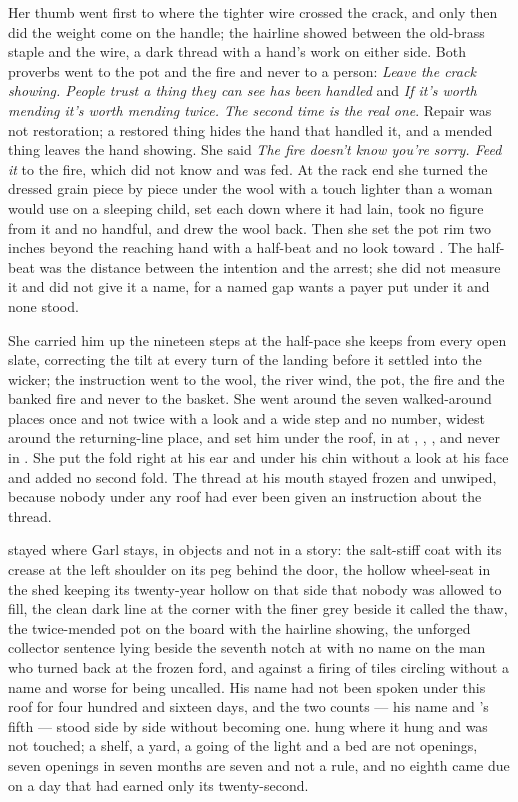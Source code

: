 Her thumb went first to where the tighter wire crossed the crack, and only then did the weight come on the handle; the hairline showed between the old-brass staple and the wire, a dark thread with a hand's work on either side. Both proverbs went to the pot and the fire and never to a person: \emph{Leave the crack showing. People trust a thing they can see has been handled} and \emph{If it's worth mending it's worth mending twice. The second time is the real one}. Repair was not restoration; a restored thing hides the hand that handled it, and a mended thing leaves the hand showing. She said \emph{The fire doesn't know you're sorry. Feed it} to the fire, which did not know and was fed. At the rack end she turned the dressed grain piece by piece under the wool with a touch lighter than a woman would use on a sleeping child, set each down where it had lain, took no figure from it and no handful, and drew the wool back. Then she set the pot rim two inches beyond the reaching hand with a half-beat and no look toward . The half-beat was the distance between the intention and the arrest; she did not measure it and did not give it a name, for a named gap wants a payer put under it and none stood.

She carried him up the nineteen steps at the half-pace she keeps from every open slate, correcting the tilt at every turn of the landing before it settled into the wicker; the instruction went to the wool, the river wind, the pot, the fire and the banked fire and never to the basket. She went around the seven walked-around places once and not twice with a look and a wide step and no number, widest around the returning-line place, and set him under the roof, in  at , , , and never in . She put the fold right at his ear and under his chin without a look at his face and added no second fold. The thread at his mouth stayed frozen and unwiped, because nobody under any roof had ever been given an instruction about the thread.

 stayed where Garl stays, in objects and not in a story: the salt-stiff coat with its crease at the left shoulder on its peg behind the door, the hollow wheel-seat in the shed keeping its twenty-year hollow on that side that nobody was allowed to fill, the clean dark line at the corner with the finer grey beside it called the thaw, the twice-mended pot on the board with the hairline showing, the unforged collector sentence lying beside the seventh notch at  with no name on the man who turned back at the frozen ford, and  against a firing of tiles circling without a name and worse for being uncalled. His name had not been spoken under this roof for four hundred and sixteen days, and the two counts --- his name and 's fifth --- stood side by side without becoming one.  hung where it hung and was not touched; a shelf, a yard, a going of the light and a bed are not openings, seven openings in seven months are seven and not a rule, and no eighth came due on a day that had earned only its twenty-second.

